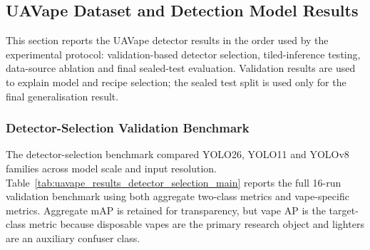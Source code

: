 \subsection{UAVape Dataset and Detection Model Results}

This section reports the UAVape detector results in the order used by the experimental protocol: validation-based detector selection, tiled-inference testing, data-source ablation and final sealed-test evaluation. Validation results are used to explain model and recipe selection; the sealed test split is used only for the final generalisation result.

\subsubsection{Detector-Selection Validation Benchmark}

The detector-selection benchmark compared YOLO26, YOLO11 and YOLOv8 families across model scale and input resolution. Table~\ref{tab:uavape_results_detector_selection_main} reports the full 16-run validation benchmark using both aggregate two-class metrics and vape-specific metrics. Aggregate mAP is retained for transparency, but vape AP is the target-class metric because disposable vapes are the primary research object and lighters are an auxiliary confuser class.


